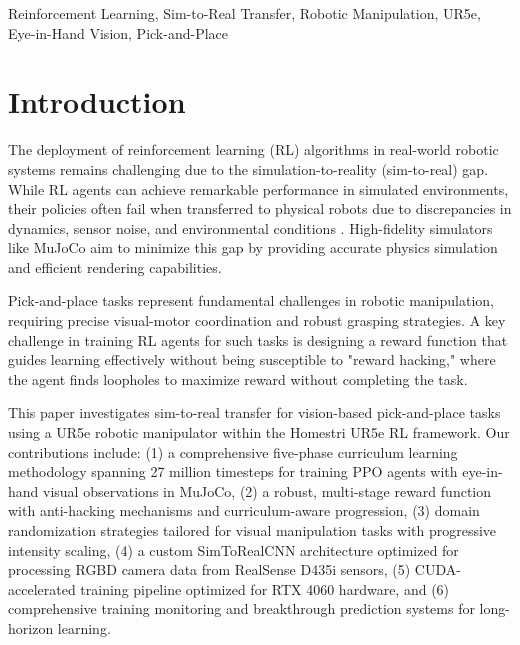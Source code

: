 \documentclass[conference]{IEEEtran}
\begin{document}
\begin{IEEEkeywords}
Reinforcement Learning, Sim-to-Real Transfer, Robotic Manipulation, UR5e, Eye-in-Hand Vision, Pick-and-Place
\end{IEEEkeywords}

\section{Introduction}
The deployment of reinforcement learning (RL) algorithms in real-world robotic systems remains challenging due to the simulation-to-reality (sim-to-real) gap. While RL agents can achieve remarkable performance in simulated environments, their policies often fail when transferred to physical robots due to discrepancies in dynamics, sensor noise, and environmental conditions \cite{zhao2020sim}. High-fidelity simulators like MuJoCo aim to minimize this gap by providing accurate physics simulation and efficient rendering capabilities.

Pick-and-place tasks represent fundamental challenges in robotic manipulation, requiring precise visual-motor coordination and robust grasping strategies. A key challenge in training RL agents for such tasks is designing a reward function that guides learning effectively without being susceptible to "reward hacking," where the agent finds loopholes to maximize reward without completing the task.

This paper investigates sim-to-real transfer for vision-based pick-and-place tasks using a UR5e robotic manipulator within the Homestri UR5e RL framework. Our contributions include: (1) a comprehensive five-phase curriculum learning methodology spanning 27 million timesteps for training PPO agents with eye-in-hand visual observations in MuJoCo, (2) a robust, multi-stage reward function with anti-hacking mechanisms and curriculum-aware progression, (3) domain randomization strategies tailored for visual manipulation tasks with progressive intensity scaling, (4) a custom SimToRealCNN architecture optimized for processing RGBD camera data from RealSense D435i sensors, (5) CUDA-accelerated training pipeline optimized for RTX 4060 hardware, and (6) comprehensive training monitoring and breakthrough prediction systems for long-horizon learning.

\end{document}
